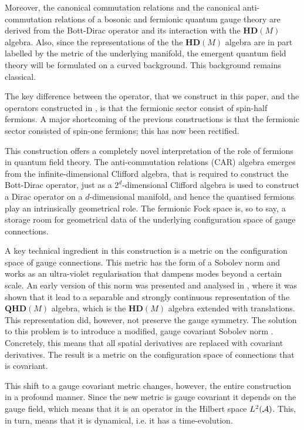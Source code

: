 \documentclass[12pt]{article}
\def\ca{{\cal A}}
\begin{document}
Moreover, the canonical commutation relations and the canonical anti-commutation relations of a bosonic and fermionic quantum gauge theory are derived from the Bott-Dirac operator and its interaction with the $\mathbf{HD}(M)$ algebra. Also, since the representations of the the $\mathbf{HD}(M)$ algebra are in part labelled by the metric of the underlying manifold, the emergent quantum field theory will be formulated on a curved background. This background remains classical. 



The key difference between the operator, that we construct in this paper, and the operators constructed in \cite{Aastrup:2019yui,Aastrup:2017atr}, is that the fermionic sector consist of spin-half fermions. A major shortcoming of the previous constructions is that the fermionic sector consisted of spin-one fermions; this has now been rectified.


This construction offers a completely novel interpretation of the role of fermions in quantum field theory. The anti-commutation relations (CAR) algebra emerges from the infinite-dimensional Clifford algebra, that is required to construct the Bott-Dirac operator, just as a $2^d$-dimensional Clifford algebra is used to construct a Dirac operator on a $d$-dimensional manifold, and hence the quantised fermions play an intrinsically geometrical role. The fermionic Fock space is, so to say, a storage room for geometrical data of the underlying configuration space of gauge connections. 

A key technical ingredient in this construction is a metric on the configuration space of gauge connections. This metric has the form of a Sobolev norm and works as an ultra-violet regularisation that dampens modes beyond a certain scale. An early version of this norm was presented and analysed in \cite{Aastrup:2017vrm}, where it was shown that it lead to a separable and strongly continuous representation of the $\mathbf{QHD}(M)$ algebra, which is the $\mathbf{HD}(M)$ algebra extended with translations. This representation did, however, not preserve the gauge symmetry. The solution to this problem is to introduce a modified, gauge covariant Sobolev norm \cite{Aastrup:2019yui}. Concretely, this means that all spatial derivatives are replaced with covariant derivatives. The result is a metric on the configuration space of connections that is covariant. 

This shift to a gauge covariant metric changes, however, the entire construction in a profound manner. Since the new metric is gauge covariant it depends on the gauge field, which means that it is an operator in the Hilbert space $L^2(\ca)$. This, in turn, means that it is dynamical, i.e. it has a time-evolution.
\end{document}
